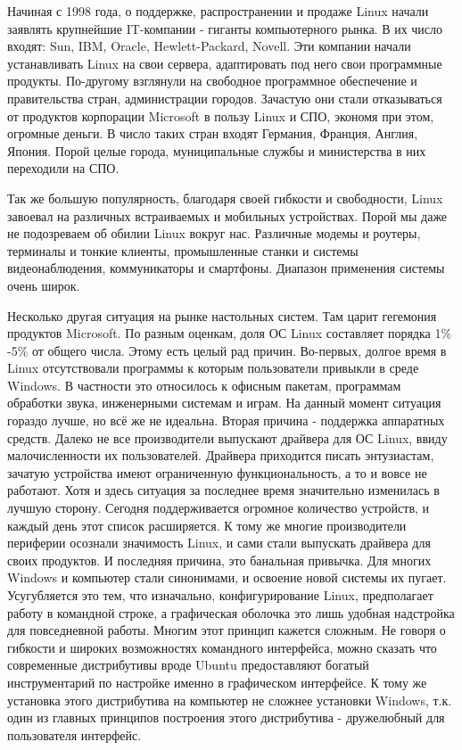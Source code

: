 \documentclass[bachelor, och, referat, times]{SCWorks}
\begin{document}
\par Начиная с 1998 года, о поддержке, распространении и продаже Linux 
начали заявлять крупнейшие IT-компании - гиганты компьютерного рынка. В их
число входят: Sun, IBM, Oracle, Hewlett-Packard, Novell. Эти компании 
начали устанавливать Linux на свои сервера, адаптировать под него свои 
программные продукты. По-другому взглянули на свободное программное 
обеспечение и правительства стран, администрации городов. Зачастую они 
стали отказываться от продуктов корпорации Microsoft в пользу Linux и СПО,
экономя при этом, огромные деньги. В число таких стран входят Германия, 
Франция, Англия, Япония. Порой целые города, муниципальные службы и 
министерства в них переходили на СПО.

\par Так же большую популярность, благодаря своей гибкости и свободности, 
Linux завоевал на различных встраиваемых и мобильных устройствах. Порой мы
даже не подозреваем об обилии Linux вокруг нас. Различные модемы и 
роутеры, терминалы и тонкие клиенты, промышленные станки и системы 
видеонаблюдения, коммуникаторы и смартфоны. Диапазон применения системы 
очень широк.

\par Несколько другая ситуация на рынке настольных систем. Там царит 
гегемония продуктов Microsoft. По разным оценкам, доля ОС Linux составляет
порядка 1\% -5\% от общего числа. Этому есть целый рад причин. Во-первых, 
долгое время в Linux отсутствовали программы к которым пользователи 
привыкли в среде Windows. В частности это относилось к офисным пакетам, 
программам обработки звука, инженерными системам и играм. На данный момент
ситуация гораздо лучше, но всё же не идеальна. Вторая причина - поддержка 
аппаратных средств. Далеко не все производители выпускают драйвера для ОС 
Linux, ввиду малочисленности их пользователей. Драйвера приходится писать 
энтузиастам, зачатую устройства имеют ограниченную функциональность, а то 
и вовсе не работают. Хотя и здесь ситуация за последнее время значительно 
изменилась в лучшую сторону. Сегодня поддерживается огромное количество 
устройств, и каждый день этот список расширяется. К тому же многие 
производители периферии осознали значимость Linux, и сами стали выпускать 
драйвера для своих продуктов. И последняя причина, это банальная привычка.
Для многих Windows и компьютер стали синонимами, и освоение новой системы 
их пугает. Усугубляется это тем, что изначально, конфигурирование Linux, 
предполагает работу в командной строке, а графическая оболочка это лишь 
удобная надстройка для повседневной работы. Многим этот принцип кажется 
сложным. Не говоря о гибкости и широких возможностях командного 
интерфейса, можно сказать что современные дистрибутивы вроде Ubuntu 
предоставляют богатый инструментарий по настройке именно в графическом 
интерфейсе. К тому же установка этого дистрибутива на компьютер не сложнее
установки Windows, т.к. один из главных принципов построения этого 
дистрибутива - дружелюбный для пользователя интерфейс.
\end{document}
